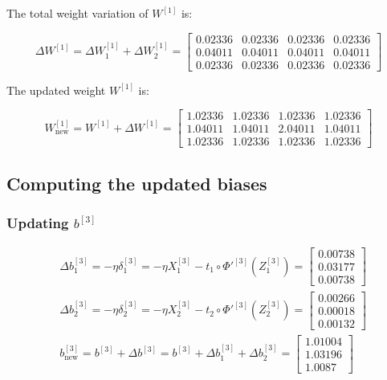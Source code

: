 \documentclass{article}
\begin{document}
The total weight variation of $W^{[1]}$ is:

\[ \Delta W^{[1]} = \Delta W^{[1]}_1 + \Delta W^{[1]}_2 = \begin{bmatrix} 0.02336 & 0.02336 & 0.02336 & 0.02336 \\  0.04011 & 0.04011 & 0.04011 & 0.04011 \\  0.02336 & 0.02336 & 0.02336 & 0.02336  \end{bmatrix} \]

The updated weight $W^{[1]}$ is:

\[ W^{[1]}_{\text{new}} = W^{[1]} + \Delta W^{[1]} = \begin{bmatrix} 1.02336 & 1.02336 & 1.02336 & 1.02336 \\  1.04011 & 1.04011 & 2.04011 & 1.04011 \\  1.02336 & 1.02336 & 1.02336 & 1.02336\end{bmatrix} \]

\subsection*{Computing the updated biases}

\subsubsection*{Updating $b^{[3]}$}

\begin{align*}
    &\Delta b^{[3]}_1 = - \eta \delta^{[3]}_1 = - \eta X^{[3]}_1 - t_1 \circ \Phi'^{[3]}(Z^{[3]}_1) = \begin{bmatrix} 0.00738 \\  0.03177 \\  0.00738\end{bmatrix}\\
    &\Delta b^{[3]}_2 = - \eta \delta^{[3]}_2 = - \eta X^{[3]}_2 - t_2 \circ \Phi'^{[3]}(Z^{[3]}_2) = \begin{bmatrix} 0.00266 \\  0.00018 \\  0.00132\end{bmatrix} \\
    &b^{[3]}_{\text{new}} = b^{[3]} + \Delta b^{[3]} = b^{[3]} + \Delta b^{[3]}_1 + \Delta b^{[3]}_2 = \begin{bmatrix} 1.01004 \\  1.03196 \\  1.0087 \end{bmatrix} \\
\end{align*}
\end{document}
